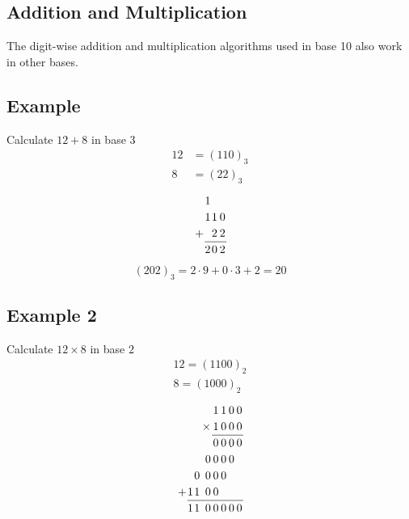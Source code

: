 \documentclass{article}
\theoremstyle{mytheoremstyle}
\theoremstyle{mytheoremstyle}
\theoremstyle{myproblemstyle}
\begin{document}
    \subsection*{Addition and Multiplication}
    The digit-wise addition and multiplication algorithms used in base 10 also
    work in other bases.

    \subsection*{Example}
    Calculate $12 + 8$ in base $3$
    \begin{align*}
        12 &= (110)_3 \\
        8 &= (22)_3
    \end{align*}
    \begin{align*}
        \arraycolsep=1pt
        \renewcommand\arraystretch{1.2}
        \begin{array}{*1r @{\hskip\arraycolsep}c@{\hskip\arraycolsep} *{11}r}
              & 1 &   &   \\
              & 1 & 1 & 0 \\
            + &   & 2 & 2 \\
              \cline{2-4}
              & 2 & 0 & 2
        \end{array}
    \end{align*}
    \[
        (202)_3 = 2\cdot 9 + 0\cdot 3 + 2 = 20
    \]

    \subsection*{Example 2}
    Calculate $12\times 8$ in base $2$
    \begin{align*}
        12 = (1100)_2 \\
        8 = (1000)_2
    \end{align*}
    \begin{align*}
        \arraycolsep=1pt
        \renewcommand\arraystretch{1.2}
        \begin{array}{*1r @{\hskip\arraycolsep}c@{\hskip\arraycolsep} *{11}r}
              &   &   &   & 1 & 1 & 0 & 0 \\
              &   &&\times& 1 & 0 & 0 & 0 \\
            \cline{5-8}
              &   &   &   & 0 & 0 & 0 & 0 \\
              &   &   & 0 & 0 & 0 & 0 &   \\
              &   & 0 & 0 & 0 & 0 &   &   \\
            + & 1 & 1 & 0 & 0 &   &   &   \\
            \cline{2-8}
              & 1 & 1 & 0 & 0 & 0 & 0 & 0
        \end{array}
    \end{align*}
\end{document}
